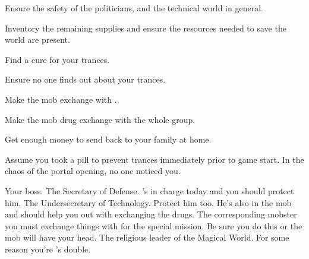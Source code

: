 \documentclass[char]{guildcamp3}
\begin{document}

\begin{itemz}[Goals]
  \item Ensure the safety of the politicians, and the technical world in general.
  \item Inventory the remaining supplies and ensure the resources needed to save the world are present.
  \item Find a cure for your trances.
  \item Ensure no one finds out about your trances.
  \item Make the mob exchange with \cServant{\informal}.
  \item Make the mob drug exchange with the whole group.
  \item Get enough money to send back to your family at home. 
\end{itemz}

\begin{itemz}[Notes]
  \item Assume you took a pill to prevent trances immediately prior to game start. In the chaos of the portal opening, no one noticed you. 
\end{itemz}


\begin{contacts}
  \contact{\cSpecOpOne{}} Your boss.
  \contact{\cPoliOne{}} The Secretary of Defense. 's in charge today and you should protect him.
  \contact{\cPoliTwo{}} The Undersecretary of Technology. Protect him too. He's also in the mob and should help you out with exchanging the drugs. 
  \contact{\cServant{}} The corresponding mobster you must exchange things with for the special mission. Be sure you do this or the mob will have your head.
  \contact{\cPaladin{}} The religious leader of the Magical World. For some reason you're \cPaladin{}'s double. 
\end{contacts}
\end{document}
